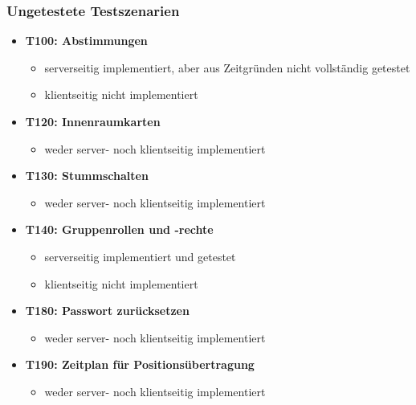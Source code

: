 \documentclass[parskip=full,11pt]{scrartcl}
\begin{document}
	\subsubsection{Ungetestete Testszenarien}
		\begin{itemize}
    	    \item \textbf{T100: Abstimmungen}
                \begin{itemize}
                	\item serverseitig implementiert, aber aus Zeitgründen nicht
                    		vollständig getestet
                	\item klientseitig nicht implementiert
                \end{itemize}
			\item \textbf{T120: Innenraumkarten}
                \begin{itemize}
                	\item weder server- noch klientseitig implementiert
                \end{itemize}
			\item \textbf{T130: Stummschalten}
                \begin{itemize}
                	\item weder server- noch klientseitig implementiert
                \end{itemize}
			\item \textbf{T140: Gruppenrollen und -rechte}
                \begin{itemize}
                \item serverseitig implementiert und getestet
                	\item klientseitig nicht implementiert
                \end{itemize}
			\item \textbf{T180: Passwort zurücksetzen}
                \begin{itemize}
                	\item weder server- noch klientseitig implementiert
                \end{itemize}
			\item \textbf{T190: Zeitplan für Positionsübertragung}
                \begin{itemize}
                	\item weder server- noch klientseitig implementiert
                \end{itemize}
		\end{itemize}
\end{document}
